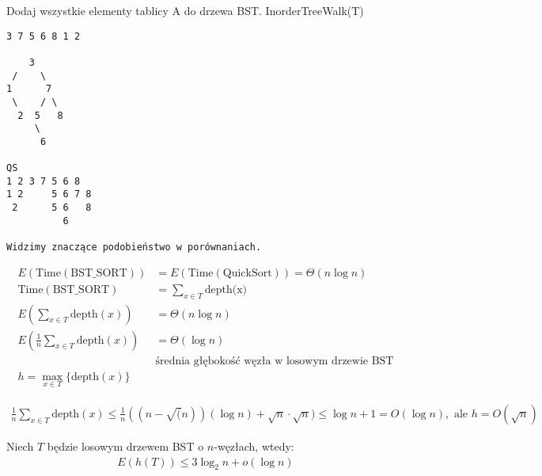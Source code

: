 \documentclass{article}
\numberwithin{equation}{subsection}
\newenvironment{theorem}[1]{%
    \trivlist
    \item[\hskip\labelsep\textbf{Theorem. #1.}]
    \ignorespaces
}{%
    \endtrivlist
}
\begin{document}
Dodaj wszystkie elementy tablicy A do drzewa BST.
InorderTreeWalk(T)

\begin{verbatim}
3 7 5 6 8 1 2
  
    3
 /    \
1      7
 \    / \
  2  5   8
     \
      6

QS
1 2 3 7 5 6 8
1 2     5 6 7 8
 2      5 6   8
          6

Widzimy znaczące podobieństwo w porównaniach.
\end{verbatim}

\begin{align}
    E(\text{Time}(\text{BST\_SORT})) &= E(\text{Time}(\text{QuickSort})) = \Theta(n\log n)\\
    \text{Time}(\text{BST\_SORT}) &= \sum_{x\in T} \text{depth(x)}\\
    E\left(\sum_{x\in T} \text{depth}(x)\right) &= \Theta(n\log n)\\
    E\left(\frac{1}{n}\sum_{x\in T} \text{depth}(x)\right) &= \Theta(\log n)\\
    &\text{średnia głębokość węzła w losowym drzewie BST}\\
    h = \max_{x\in T}\{\text{depth}(x)\}
\end{align}

\begin{align}
\frac{1}{n} \sum_{x\in T} \text{depth}(x) \leq \frac{1}{n} ((n-\sqrt(n))(\log n) + \sqrt{n}\cdot\sqrt{n}) \leq \log n + 1 = O(\log n), \text{ ale } h = O(\sqrt{n}) 
\end{align}

\begin{theorem}{Wysokość BST}
    Niech $T$ będzie losowym drzewem BST o $n$-węzłach, wtedy:
    \begin{align}
        E(h(T)) \leq 3\log_2 n + o(\log n)
    \end{align}
\end{theorem}
\end{document}
